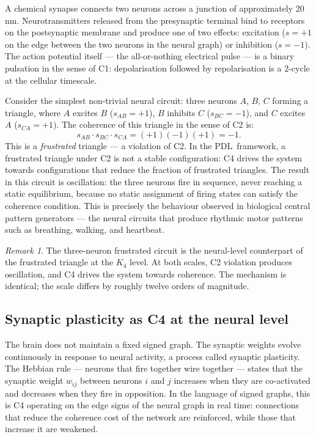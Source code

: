 \documentclass[12pt,a4paper]{article}
\theoremstyle{plain}
\theoremstyle{definition}
\theoremstyle{remark}
\newtheorem{remark}[theorem]{Remark}
\newcommand{\PDL}{\textsc{PDL}}
\newcommand{\Kfour}{K_4}
\begin{document}
A chemical synapse connects two neurons across a junction of approximately 20\,nm.
Neurotransmitters released from the presynaptic terminal bind to receptors on the
postsynaptic membrane and produce one of two effects: excitation ($s = +1$ on the
edge between the two neurons in the neural graph) or inhibition ($s = -1$). The
action potential itself --- the all-or-nothing electrical pulse --- is a binary
pulsation in the sense of C1: depolarisation followed by repolarisation is a 2-cycle
at the cellular timescale.

Consider the simplest non-trivial neural circuit: three neurons $A$, $B$, $C$
forming a triangle, where $A$ excites $B$ ($s_{AB} = +1$), $B$ inhibits $C$
($s_{BC} = -1$), and $C$ excites $A$ ($s_{CA} = +1$). The coherence of this triangle
in the sense of C2 is:
\begin{equation}
s_{AB} \cdot s_{BC} \cdot s_{CA} = (+1)(-1)(+1) = -1.
\end{equation}
This is a \emph{frustrated} triangle --- a violation of C2. In the \PDL\ framework,
a frustrated triangle under C2 is not a stable configuration: C4 drives the system
towards configurations that reduce the fraction of frustrated triangles. The result
in this circuit is oscillation: the three neurons fire in sequence, never reaching a
static equilibrium, because no static assignment of firing states can satisfy the
coherence condition. This is precisely the behaviour observed in biological central
pattern generators --- the neural circuits that produce rhythmic motor patterns such
as breathing, walking, and heartbeat.

\begin{remark}
The three-neuron frustrated circuit is the neural-level counterpart of the frustrated
triangle at the $\Kfour$ level. At both scales, C2 violation produces oscillation,
and C4 drives the system towards coherence. The mechanism is identical; the scale
differs by roughly twelve orders of magnitude.
\end{remark}

\subsection{Synaptic plasticity as C4 at the neural level}

The brain does not maintain a fixed signed graph. The synaptic weights evolve
continuously in response to neural activity, a process called synaptic plasticity.
The Hebbian rule --- neurons that fire together wire together --- states that the
synaptic weight $w_{ij}$ between neurons $i$ and $j$ increases when they are
co-activated and decreases when they fire in opposition. In the language of signed
graphs, this is C4 operating on the edge signs of the neural graph in real time:
connections that reduce the coherence cost of the network are reinforced, while those
that increase it are weakened.
\end{document}
